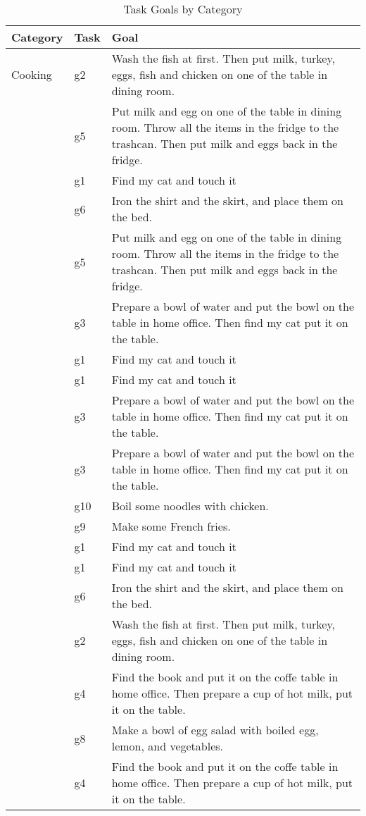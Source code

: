 \begin{table}[htbp]
\centering
\caption{Task Goals by Category}
\begin{tabular}{l|l|l}
\hline
\textbf{Category} & \textbf{Task} & \textbf{Goal} \\
\hline
Cooking & g2 & Wash the fish at first. Then put milk, turkey, eggs, fish and chicken on one of the table in dining room. \\
 & g5 & Put milk and egg on one of the table in dining room. Throw all the items in the fridge to the trashcan. Then put milk and eggs back in the fridge. \\
 & g1 & Find my cat and touch it \\
 & g6 & Iron the shirt and the skirt, and place them on the bed. \\
 & g5 & Put milk and egg on one of the table in dining room. Throw all the items in the fridge to the trashcan. Then put milk and eggs back in the fridge. \\
 & g3 & Prepare a bowl of water and put the bowl on the table in home office. Then find my cat put it on the table. \\
 & g1 & Find my cat and touch it \\
 & g1 & Find my cat and touch it \\
 & g3 & Prepare a bowl of water and put the bowl on the table in home office. Then find my cat put it on the table. \\
 & g3 & Prepare a bowl of water and put the bowl on the table in home office. Then find my cat put it on the table. \\
 & g10 & Boil some noodles with chicken. \\
 & g9 & Make some French fries. \\
 & g1 & Find my cat and touch it \\
 & g1 & Find my cat and touch it \\
 & g6 & Iron the shirt and the skirt, and place them on the bed. \\
 & g2 & Wash the fish at first. Then put milk, turkey, eggs, fish and chicken on one of the table in dining room. \\
 & g4 & Find the book and put it on the coffe table in home office. Then prepare a cup of hot milk, put it on the table. \\
 & g8 & Make a bowl of egg salad with boiled egg, lemon, and vegetables. \\
 & g4 & Find the book and put it on the coffe table in home office. Then prepare a cup of hot milk, put it on the table. \\

\end{tabular}
\end{table}
